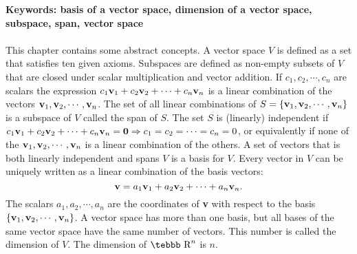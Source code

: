 {\bf Keywords: basis of a vector space, dimension of a vector space, subspace, span, vector space }
\\ \\
This chapter contains some abstract concepts. A vector space $V$ is
defined as a set that satisfies ten given axioms. Subspaces are
defined as non-empty subsets of $V$ that are closed under scalar
multiplication and vector addition. If $c_1,c_2,\cdots,c_n$ are
scalars the expression $c_1{\bf v}_1+c_2{\bf v}_2+\cdots+c_n{\bf
v}_n$ is a linear combination of the vectors ${\bf v}_1,{\bf
v}_2,\cdots,{\bf v}_n$. The set of all linear combinations of
$S=\{ {\bf v}_1,{\bf v}_2,\cdots,{\bf v}_n \}$ is a subspace of
$V$ called the span of $S$. The set $S$ is (linearly) independent
if $c_1{\bf v}_1+c_2{\bf v}_2+\cdots+c_n{\bf v}_n={\bf
0}\Rightarrow c_1=c_2=\cdots=c_n=0$, or equivalently if none of
the ${\bf v}_1,{\bf v}_2,\cdots,{\bf v}_n$ is a linear combination
of the others. A set of vectors that is both linearly independent
and spans $V$ is a basis for $V$. Every vector in $V$ can be
uniquely written as a linear combination of the basis vectors:
$${\bf v}=a_1{\bf v}_1+a_2{\bf v}_2+\cdots+a_n{\bf v}_n.$$ The
scalars $a_1,a_2,\cdots,a_n$ are the coordinates of {\bf v} with
respect to the basis $\{ {\bf v}_1,{\bf v}_2,\cdots,{\bf v}_n \}$.
A vector space has more than one basis, but all bases of the same
vector space have the same number of vectors. This number is
called the dimension of $V$. The dimension of $\mbox {\tebbb R}^n$
is $n$.



%
